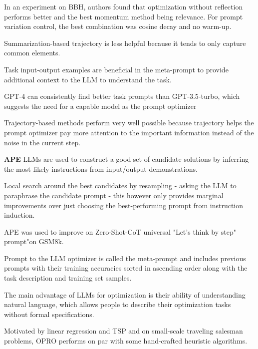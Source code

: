 In an experiment on BBH, authors found that optimization without reflection performs better and the best momentum method being relevance. For prompt variation control, the best combination was cosine decay and no warm-up.  \cite{tang2024unleashingpotentiallargelanguage}

Summarization-based trajectory is less helpful because it tends to only capture common elements. \cite{tang2024unleashingpotentiallargelanguage}

Task input-output examples are beneficial in the meta-prompt to provide additional context to the LLM to understand the task. \cite{tang2024unleashingpotentiallargelanguage}

GPT-4 can consistently find better task prompts than GPT-3.5-turbo, which suggests the need for a capable model as the prompt optimizer \cite{tang2024unleashingpotentiallargelanguage}

Trajectory-based methods perform very well possible because trajectory helps the prompt optimizer pay more attention to the important information instead of the noise in the current step. \cite{tang2024unleashingpotentiallargelanguage}

\textbf{APE}
LLMs are used to construct a good set of candidate solutions by inferring the most likely instructions from input/output demonstrations. \cite{zhou2023largelanguagemodelshumanlevel}

Local search around the best candidates by resampling - asking the LLM to paraphrase the candidate prompt - this however only provides marginal improvements over just choosing the best-performing prompt from instruction induction. \cite{zhou2023largelanguagemodelshumanlevel}

APE was used to improve on Zero-Shot-CoT \cite{NEURIPS2022_8bb0d291} universal "Let's think by step" prompt"on GSM8k.\cite{zhou2023largelanguagemodelshumanlevel}


Prompt to the LLM optimizer is called the meta-prompt and includes previous prompts with their training accuracies sorted in ascending order along with the task description and training set samples. \cite{yang2024largelanguagemodelsoptimizers}

The main advantage of LLMs for optimization is their ability of understanding natural language, which allows people to describe their optimization tasks without formal specifications. \cite{yang2024largelanguagemodelsoptimizers}

Motivated by linear regression and TSP and on small-scale traveling salesman problems, OPRO performs on par with some hand-crafted heuristic algorithms. \cite{yang2024largelanguagemodelsoptimizers}

